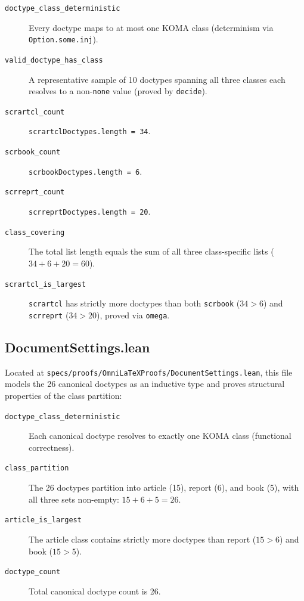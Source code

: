 \begin{description}
    \item[{\texttt{doctype\_class\_deterministic}}] Every doctype maps to
        at most one KOMA class (determinism via \texttt{Option.some.inj}).

    \item[{\texttt{valid\_doctype\_has\_class}}] A representative sample of
        10 doctypes spanning all three classes each resolves to a
        non-\texttt{none} value (proved by \texttt{decide}).

    \item[{\texttt{scrartcl\_count}}] \texttt{scrartclDoctypes.length = 34}.

    \item[{\texttt{scrbook\_count}}] \texttt{scrbookDoctypes.length = 6}.

    \item[{\texttt{scrreprt\_count}}] \texttt{scrreprtDoctypes.length = 20}.

    \item[{\texttt{class\_covering}}] The total list length equals the sum
        of all three class-specific lists
        ($34 + 6 + 20 = 60$).

    \item[{\texttt{scrartcl\_is\_largest}}] \texttt{scrartcl} has strictly
        more doctypes than both \texttt{scrbook} ($34 > 6$) and
        \texttt{scrreprt} ($34 > 20$), proved via \texttt{omega}.
\end{description}

\subsection{DocumentSettings.lean}

Located at \texttt{specs/proofs/OmniLaTeXProofs/DocumentSettings.lean},
this file models the 26 canonical doctypes as an inductive type and
proves structural properties of the class partition:

\begin{description}
    \item[{\texttt{doctype\_class\_deterministic}}] Each canonical doctype
        resolves to exactly one KOMA class (functional correctness).

    \item[{\texttt{class\_partition}}] The 26 doctypes partition into
        article (15), report (6), and book (5), with all three sets
        non-empty: $15 + 6 + 5 = 26$.

    \item[{\texttt{article\_is\_largest}}] The article class contains
        strictly more doctypes than report ($15 > 6$) and book
        ($15 > 5$).

    \item[{\texttt{doctype\_count}}] Total canonical doctype count is 26.
\end{description}

